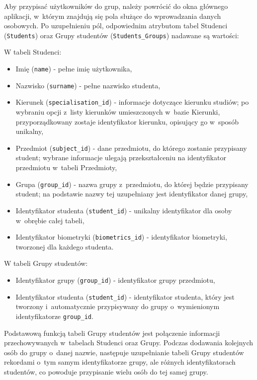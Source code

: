 Aby przypisać użytkowników do grup, należy powrócić do okna głównego aplikacji, w~którym znajdują się pola służące do wprowadzania danych osobowych. Po uzupełnieniu pól, odpowiednim atrybutom tabel Studenci (\verb!Students!) oraz Grupy studentów (\verb!Students_Groups!) nadawane są wartości:

W tabeli Studenci:
\begin{itemize}
\item Imię (\verb!name!) - pełne imię użytkownika,
\item Nazwisko (\verb!surname!) - pełne nazwisko studenta,
\item Kierunek (\verb!specialisation_id!) - informacje dotyczące kierunku studiów; po wybraniu opcji z~listy kierunków umieszczonych w~bazie Kierunki, przyporządkowany zostaje identyfikator kierunku, opisujący go w~sposób unikalny,
\item Przedmiot (\verb!subject_id!) - dane przedmiotu, do którego zostanie przypisany student; wybrane informacje ulegają przekształceniu na identyfikator przedmiotu w~tabeli Przedmioty,
\item Grupa (\verb!group_id!) - nazwa grupy z~przedmiotu, do której będzie przypisany student; na podstawie nazwy tej uzupełniany jest identyfikator danej grupy,
\item Identyfikator studenta (\verb!student_id!) - unikalny identyfikator dla osoby w~obrębie całej tabeli,
\item Identyfikator biometryki (\verb!biometrics_id!) - identyfikator biometryki, tworzonej dla każdego studenta.
\end{itemize}

W tabeli Grupy studentów:
\begin{itemize}
\item Identyfikator grupy (\verb!group_id!) - identyfikator grupy przedmiotu,
\item Identyfikator studenta (\verb!student_id!) - identyfikator studenta, który jest tworzony i~automatycznie przypisywany do grupy o~wymienionym identyfikatorze \verb!group_id!.
\end{itemize}

Podstawową funkcją tabeli Grupy studentów jest połączenie informacji przechowywanych w~tabelach Studenci oraz Grupy. Podczas dodawania kolejnych osób do grupy o~danej nazwie, następuje uzupełnianie tabeli Grupy studentów rekordami o~tym samym identyfikatorze grupy, ale różnych identyfikatorach studentów, co powoduje przypisanie wielu osób do tej samej grupy. 

